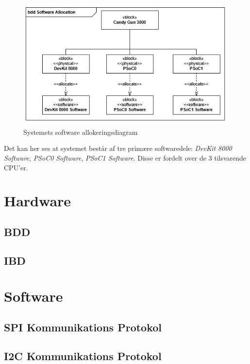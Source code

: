 \begin{figure}[H]
	\centering
	\includegraphics[width=\textwidth]{SystemArkitektur/images/SoftwareAllocation.PNG}
	\caption{Systemets software allokeringsdiagram}
	\label{figure:allocationDiagram}
\end{figure}

Det kan her ses at systemet består af tre primære softwaredele: \textit{DevKit 8000 Software}, \textit{PSoC0 Software}, \textit{PSoC1 Software}. Disse er fordelt over de 3 tilsvarende CPU'er.

\section{Hardware}

\subsection{BDD}

\subsection{IBD}

\section{Software}

\subsection{SPI Kommunikations Protokol}

\subsection{I2C Kommunikations Protokol}


